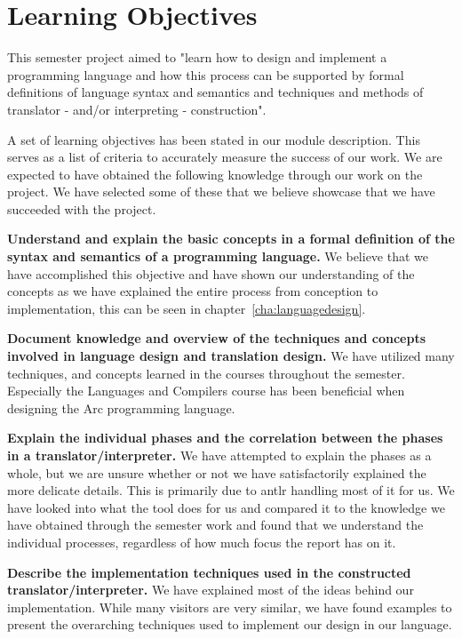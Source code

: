 \section{Learning Objectives}\label{sec:learning_objectives}
This semester project aimed to "learn how to design and implement a programming language and how this process can be supported by formal definitions of language syntax and semantics and techniques and methods of translator - and/or interpreting - construction".

A set of learning objectives has been stated in our module description. This serves as a list of criteria to accurately measure the success of our work. We are expected to have obtained the following knowledge through our work on the project. We have selected some of these that we believe showcase that we have succeeded with the project. 

\textbf{Understand and explain the basic concepts in a formal definition of the syntax and semantics of a programming language.} We believe that we have accomplished this objective and have shown our understanding of the concepts as we have explained the entire process from conception to implementation, this can be seen in chapter~\ref*{cha:languagedesign}.

\textbf{Document knowledge and overview of the techniques and concepts involved in language design and translation design.} We have utilized many techniques, and concepts learned in the courses throughout the semester. Especially the Languages and Compilers course has been beneficial when designing the Arc programming language.

\textbf{Explain the individual phases and the correlation between the phases in a translator/interpreter.} We have attempted to explain the phases as a whole, but we are unsure whether or not we have satisfactorily explained the more delicate details. This is primarily due to \gls{antlr} handling most of it for us. We have looked into what the tool does for us and compared it to the knowledge we have obtained through the semester work and found that we understand the individual processes, regardless of how much focus the report has on it.

\textbf{Describe the implementation techniques used in the constructed translator/interpreter.} We have explained most of the ideas behind our implementation. While many visitors are very similar, we have found examples to present the overarching techniques used to implement our design in our language.

